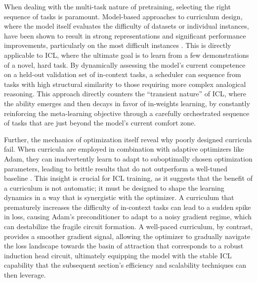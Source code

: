 \documentclass[11pt]{article}
\begin{document}
When dealing with the multi-task nature of pretraining, selecting the right sequence of tasks is paramount. Model-based approaches to curriculum design, where the model itself evaluates the difficulty of datasets or individual instances, have been shown to result in strong representations and significant performance improvements, particularly on the most difficult instances \cite{ref202}. This is directly applicable to ICL, where the ultimate goal is to learn from a few demonstrations of a novel, hard task. By dynamically assessing the model's current competence on a held-out validation set of in-context tasks, a scheduler can sequence from tasks with high structural similarity to those requiring more complex analogical reasoning. This approach directly counters the ``transient nature'' of ICL, where the ability emerges and then decays in favor of in-weights learning, by constantly reinforcing the meta-learning objective through a carefully orchestrated sequence of tasks that are just beyond the model's current comfort zone.

Further, the mechanics of optimization itself reveal why poorly designed curricula fail. When curricula are employed in combination with adaptive optimizers like Adam, they can inadvertently learn to adapt to suboptimally chosen optimization parameters, leading to brittle results that do not outperform a well-tuned baseline \cite{ref203}. This insight is crucial for ICL training, as it suggests that the benefit of a curriculum is not automatic; it must be designed to shape the learning dynamics in a way that is synergistic with the optimizer. A curriculum that prematurely increases the difficulty of in-context tasks can lead to a sudden spike in loss, causing Adam's preconditioner to adapt to a noisy gradient regime, which can destabilize the fragile circuit formation. A well-paced curriculum, by contrast, provides a smoother gradient signal, allowing the optimizer to gradually navigate the loss landscape towards the basin of attraction that corresponds to a robust induction head circuit, ultimately equipping the model with the stable ICL capability that the subsequent section's efficiency and scalability techniques can then leverage.
\end{document}
